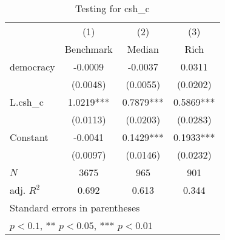 \begin{table}[htbp]\centering
\def\sym#1{\ifmmode^{#1}\else\(^{#1}\)\fi}
\caption{Testing for csh\_c \label{tab:regression3}}
\begin{tabular}{l*{3}{c}}
\hline\hline
            &\multicolumn{1}{c}{(1)}&\multicolumn{1}{c}{(2)}&\multicolumn{1}{c}{(3)}\\
            &\multicolumn{1}{c}{Benchmark}&\multicolumn{1}{c}{Median}&\multicolumn{1}{c}{Rich}\\
\hline
democracy   &     -0.0009   &     -0.0037   &      0.0311   \\
            &    (0.0048)   &    (0.0055)   &    (0.0202)   \\
[1em]
L.csh\_c     &      1.0219***&      0.7879***&      0.5869***\\
            &    (0.0113)   &    (0.0203)   &    (0.0283)   \\
[1em]
Constant    &     -0.0041   &      0.1429***&      0.1933***\\
            &    (0.0097)   &    (0.0146)   &    (0.0232)   \\
\hline
\(N\)       &        3675   &         965   &         901   \\
adj. \(R^{2}\)&       0.692   &       0.613   &       0.344   \\
\hline\hline
\multicolumn{4}{l}{\footnotesize Standard errors in parentheses}\\
\multicolumn{4}{l}{\footnotesize * \(p<0.1\), ** \(p<0.05\), *** \(p<0.01\)}\\
\end{tabular}
\end{table}
